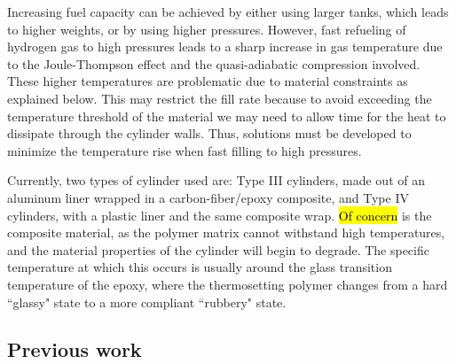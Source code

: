 \noindent Increasing fuel capacity can be achieved by either using larger tanks, which leads to higher weights, or by using higher pressures. However, fast refueling of hydrogen gas to high pressures leads to a sharp increase in gas temperature due to the Joule-Thompson effect and the quasi-adiabatic compression involved. These higher temperatures are problematic due to material constraints as explained below. This may restrict the fill rate because to avoid exceeding the temperature threshold of the material we may need to allow time for the heat to dissipate through the cylinder walls. Thus, solutions must be developed to minimize the temperature rise when fast filling to high pressures.




 
Currently, two types of cylinder used are: Type III cylinders, made out of an aluminum liner wrapped in a carbon-fiber/epoxy composite, and Type IV cylinders, with a plastic liner and the same composite wrap. \hl{Of concern} is the composite material, as the polymer matrix cannot withstand high temperatures, and the material properties of the cylinder will begin to degrade. The specific temperature at which this occurs is usually around the glass transition temperature of the epoxy, where the thermosetting polymer changes from a hard ``glassy" state to a more compliant ``rubbery" state.  

\subsection{Previous work}

